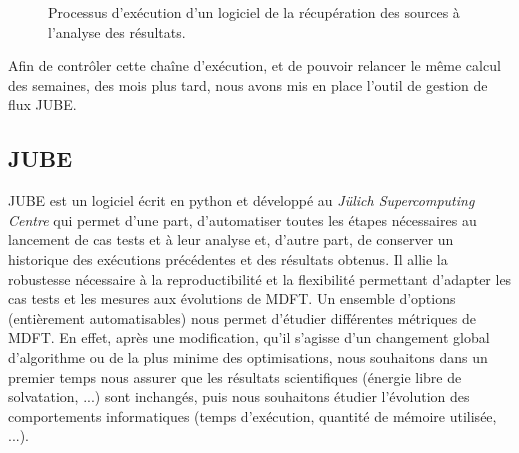 \begin{figure}[ht]
  \center
  \caption{Processus d'exécution d'un logiciel de la récupération des sources à l'analyse des résultats.}
  \label{fig:JUBE_process}
\end{figure}

Afin de contrôler cette chaîne d’exécution, et de pouvoir relancer le même calcul des semaines, des mois plus tard, nous avons mis en place l’outil de gestion de flux JUBE\cite{Luhrs_parallel_2016,Galonska_advances_2012}.

\subsection{JUBE}
JUBE est un logiciel écrit en python et développé au \textit{Jülich Supercomputing Centre} qui permet d'une part, d'automatiser toutes les étapes nécessaires au lancement de cas tests et à leur analyse et, d'autre part, de conserver un historique des exécutions précédentes et des résultats obtenus. Il allie la robustesse nécessaire à la reproductibilité et la flexibilité permettant d'adapter les cas tests et les mesures aux évolutions de MDFT. Un ensemble d'options (entièrement automatisables) nous permet d'étudier différentes métriques de MDFT. En effet, après une modification, qu'il s'agisse d'un changement global d'algorithme ou de la plus minime des optimisations, nous souhaitons dans un premier temps nous assurer que les résultats scientifiques (\'energie libre de solvatation, ...) sont inchangés, puis nous souhaitons étudier l'évolution des comportements informatiques (temps d'exécution, quantité de mémoire utilisée, ...).

